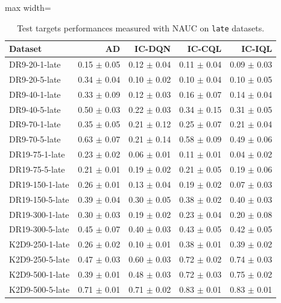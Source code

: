 \documentclass{article}
\begin{document}
\begin{table}[ht]
    \label{tab:}
    \begin{center}
    \caption{Test targets performances measured with NAUC on \texttt{late} datasets.}
    \begin{small}
    \begin{adjustbox}{max width=\columnwidth}
		\begin{tabular}{l|rrrr}
		\toprule
	\textbf{Dataset} & \textbf{AD} & \textbf{IC-DQN} & \textbf{IC-CQL} & \textbf{IC-IQL}\\
\midrule
DR9-20-1-late & 0.15 $\pm$ 0.05 & 0.12 $\pm$ 0.04 & 0.11 $\pm$ 0.04 & 0.09 $\pm$ 0.03\\
DR9-20-5-late & 0.34 $\pm$ 0.04 & 0.10 $\pm$ 0.02 & 0.10 $\pm$ 0.04 & 0.10 $\pm$ 0.05\\
DR9-40-1-late & 0.33 $\pm$ 0.09 & 0.12 $\pm$ 0.03 & 0.16 $\pm$ 0.07 & 0.14 $\pm$ 0.04\\
DR9-40-5-late & 0.50 $\pm$ 0.03 & 0.22 $\pm$ 0.03 & 0.34 $\pm$ 0.15 & 0.31 $\pm$ 0.05\\
DR9-70-1-late & 0.35 $\pm$ 0.05 & 0.21 $\pm$ 0.12 & 0.25 $\pm$ 0.07 & 0.21 $\pm$ 0.04\\
DR9-70-5-late & 0.63 $\pm$ 0.07 & 0.21 $\pm$ 0.14 & 0.58 $\pm$ 0.09 & 0.49 $\pm$ 0.06\\
DR19-75-1-late & 0.23 $\pm$ 0.02 & 0.06 $\pm$ 0.01 & 0.11 $\pm$ 0.01 & 0.04 $\pm$ 0.02\\
DR19-75-5-late & 0.21 $\pm$ 0.01 & 0.19 $\pm$ 0.02 & 0.21 $\pm$ 0.05 & 0.19 $\pm$ 0.06\\
DR19-150-1-late & 0.26 $\pm$ 0.01 & 0.13 $\pm$ 0.04 & 0.19 $\pm$ 0.02 & 0.07 $\pm$ 0.03\\
DR19-150-5-late & 0.39 $\pm$ 0.04 & 0.30 $\pm$ 0.05 & 0.38 $\pm$ 0.02 & 0.40 $\pm$ 0.03\\
DR19-300-1-late & 0.30 $\pm$ 0.03 & 0.19 $\pm$ 0.02 & 0.23 $\pm$ 0.04 & 0.20 $\pm$ 0.08\\
DR19-300-5-late & 0.45 $\pm$ 0.07 & 0.40 $\pm$ 0.03 & 0.43 $\pm$ 0.05 & 0.42 $\pm$ 0.05\\
K2D9-250-1-late & 0.26 $\pm$ 0.02 & 0.10 $\pm$ 0.01 & 0.38 $\pm$ 0.01 & 0.39 $\pm$ 0.02\\
K2D9-250-5-late & 0.47 $\pm$ 0.03 & 0.60 $\pm$ 0.03 & 0.72 $\pm$ 0.02 & 0.74 $\pm$ 0.03\\
K2D9-500-1-late & 0.39 $\pm$ 0.01 & 0.48 $\pm$ 0.03 & 0.72 $\pm$ 0.03 & 0.75 $\pm$ 0.02\\
K2D9-500-5-late & 0.71 $\pm$ 0.01 & 0.71 $\pm$ 0.02 & 0.83 $\pm$ 0.01 & 0.83 $\pm$ 0.01\\

\end{tabular}
\end{adjustbox}
\end{small}
\end{center}
\end{table}
\end{document}
